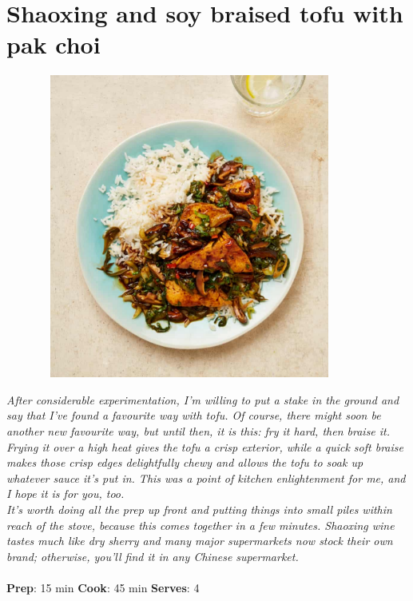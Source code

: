 \documentclass{book}
\begin{document}
\section{Shaoxing and soy braised tofu with pak choi}
\begin{figure}
\centering\includegraphics[width=10cm,height=10cm,keepaspectratio]{Recipe_Pictures/Shaoxing_and_soy_braised_tofu_with_pak_choi.png}
\end{figure}
\emph{After considerable experimentation, I’m willing to put a stake in the ground and say that I’ve found a favourite way with tofu. Of course, there might soon be another new favourite way, but until then, it is this: fry it hard, then braise it. Frying it over a high heat gives the tofu a crisp exterior, while a quick soft braise makes those crisp edges delightfully chewy and allows the tofu to soak up whatever sauce it’s put in. This was a point of kitchen enlightenment for me, and I hope it is for you, too.\\ 
It’s worth doing all the prep up front and putting things into small piles within reach of the stove, because this comes together in a few minutes. Shaoxing wine tastes much like dry sherry and many major supermarkets now stock their own brand; otherwise, you’ll find it in any Chinese supermarket.}\\\\ 
\textbf{Prep}: 15 min
\textbf{Cook}: 45 min
\textbf{Serves}: 4
\end{document}
